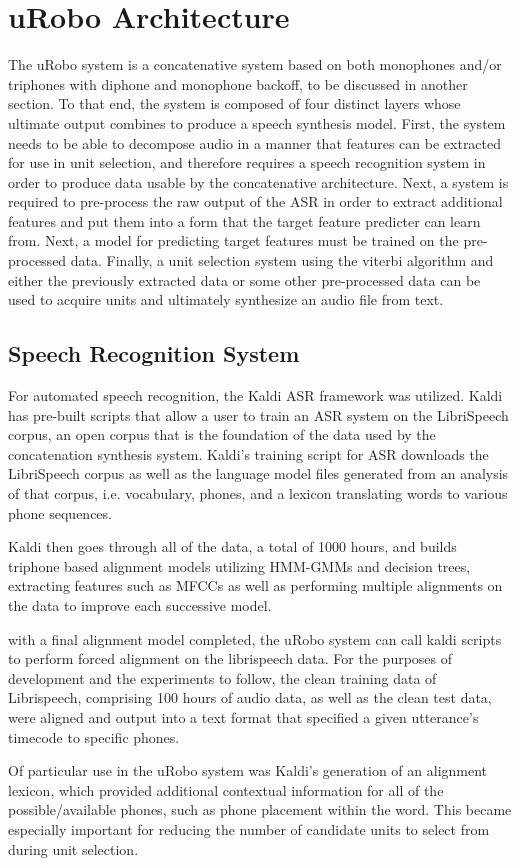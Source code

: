 \documentclass[10pt, journal, compsoc]{IEEEtran}
\begin{document}
\section{uRobo Architecture}
The uRobo system is a concatenative system based on both monophones and/or triphones with diphone and monophone backoff, to be discussed in another section. To that end, the system is composed of four distinct layers whose ultimate output combines to produce a speech synthesis model. First, the system needs to be able to decompose audio in a manner that features can be extracted for use in unit selection, and therefore requires a speech recognition system in order to produce data usable by the concatenative architecture. Next, a system is required to pre-process the raw output of the ASR in order to extract additional features and put them into a form that the target feature predicter can learn from. Next, a model for predicting target features must be trained on the pre-processed data. Finally, a unit selection system using the viterbi algorithm and either the previously extracted data or some other pre-processed data can be used to acquire units and ultimately synthesize an audio file from text.
\subsection{Speech Recognition System}
For automated speech recognition, the Kaldi ASR framework was utilized. Kaldi has pre-built scripts that allow a user to train an ASR system on the LibriSpeech corpus\cite{unknown}, an open corpus that is the foundation of the data used by the concatenation synthesis system. Kaldi's training script for ASR downloads the LibriSpeech corpus as well as the language model files generated from an analysis of that corpus, i.e. vocabulary, phones, and a lexicon translating words to various phone sequences.\par
Kaldi then goes through all of the data, a total of 1000 hours, and builds triphone based alignment models utilizing HMM-GMMs and decision trees, extracting features such as MFCCs as well as performing multiple alignments on the data to improve each successive model.\par
with a final alignment model completed, the uRobo system can call kaldi scripts to perform forced alignment on the librispeech data. For the purposes of development and the experiments to follow, the clean training data of Librispeech, comprising 100 hours of audio data, as well as the clean test data, were aligned and output into a text format that specified a given utterance's timecode to specific phones. \par
Of particular use in the uRobo system was Kaldi's generation of an alignment lexicon, which provided additional contextual information for all of the possible/available phones, such as phone placement within the word. This became especially important for reducing the number of candidate units to select from during unit selection.
\end{document}
